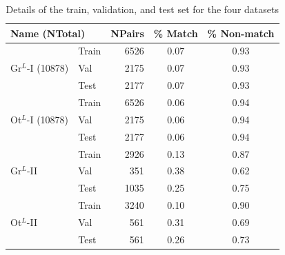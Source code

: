 \begin{table}[t]
\captionsetup{justification=centering}
  \caption{Details of the train, validation, and test set for the four datasets}
\centering
  \begin{tabular}{llrcc}
    \toprule
    \multicolumn{2}{l}{Name (NTotal)}      & NPairs & \% Match & \% Non-match \\
    \midrule
    \multirow{3}{*}{Gr$^{L}$-I (10878)}  & Train & 6526 & 0.07 & 0.93 \\
                                 & Val   & 2175 & 0.07 & 0.93 \\
                          & Test  & 2177 & 0.07 & 0.93 \\
\midrule
\multirow{3}{*}{Ot$^{L}$-I (10878)}  & Train & 6526 & 0.06 & 0.94 \\
                                 & Val   & 2175 & 0.06 & 0.94 \\
                                 & Test  & 2177 & 0.06 & 0.94 \\
\midrule
  \multirow{3}{*}{Gr$^{L}$-II} & Train & 2926 & 0.13 & 0.87\\
                                 & Val   & 351 & 0.38 & 0.62\\
                                 & Test  & 1035 & 0.25 & 0.75\\
    \midrule
    \multirow{3}{*}{Ot$^{L}$-II} & Train & 3240 & 0.10 & 0.90\\
                                 & Val   & 561 & 0.31 & 0.69\\
                                 & Test  & 561& 0.26 & 0.73\\
    \bottomrule
  \end{tabular}
  \label{tab:results_tvt}
\end{table}



